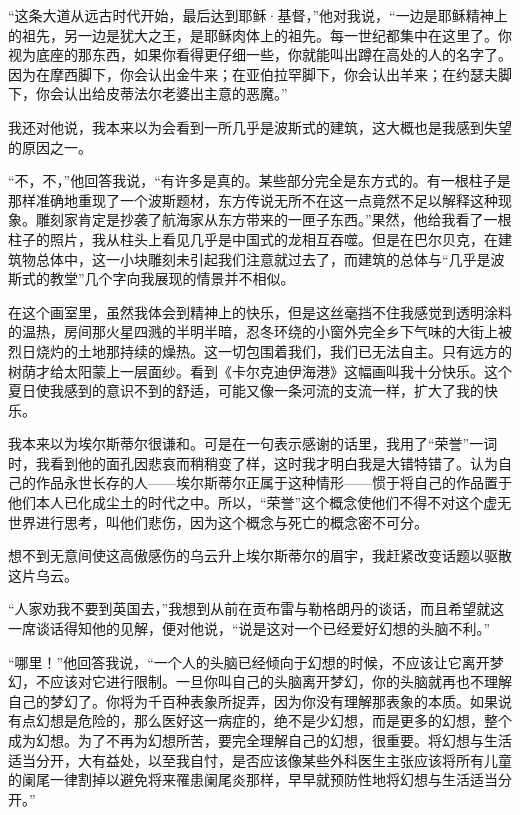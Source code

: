 \par “这条大道从远古时代开始，最后达到耶稣·基督，”他对我说，“一边是耶稣精神上的祖先，另一边是犹大之王，是耶稣肉体上的祖先。每一世纪都集中在这里了。你视为底座的那东西，如果你看得更仔细一些，你就能叫出蹲在高处的人的名字了。因为在摩西脚下，你会认出金牛来；在亚伯拉罕脚下，你会认出羊来；在约瑟夫脚下，你会认出给皮蒂法尔老婆出主意的恶魔。”
\par 我还对他说，我本来以为会看到一所几乎是波斯式的建筑，这大概也是我感到失望的原因之一。
\par “不，不，”他回答我说，“有许多是真的。某些部分完全是东方式的。有一根柱子是那样准确地重现了一个波斯题材，东方传说无所不在这一点竟然不足以解释这种现象。雕刻家肯定是抄袭了航海家从东方带来的一匣子东西。”果然，他给我看了一根柱子的照片，我从柱头上看见几乎是中国式的龙相互吞噬。但是在巴尔贝克，在建筑物总体中，这一小块雕刻未引起我们注意就过去了，而建筑的总体与“几乎是波斯式的教堂”几个字向我展现的情景并不相似。
\par 在这个画室里，虽然我体会到精神上的快乐，但是这丝毫挡不住我感觉到透明涂料的温热，房间那火星四溅的半明半暗，忍冬环绕的小窗外完全乡下气味的大街上被烈日烧灼的土地那持续的燥热。这一切包围着我们，我们已无法自主。只有远方的树荫才给太阳蒙上一层面纱。看到《卡尔克迪伊海港》这幅画叫我十分快乐。这个夏日使我感到的意识不到的舒适，可能又像一条河流的支流一样，扩大了我的快乐。
\par 我本来以为埃尔斯蒂尔很谦和。可是在一句表示感谢的话里，我用了“荣誉”一词时，我看到他的面孔因悲哀而稍稍变了样，这时我才明白我是大错特错了。认为自己的作品永世长存的人——埃尔斯蒂尔正属于这种情形——惯于将自己的作品置于他们本人已化成尘土的时代之中。所以，“荣誉”这个概念使他们不得不对这个虚无世界进行思考，叫他们悲伤，因为这个概念与死亡的概念密不可分。
\par 想不到无意间使这高傲感伤的乌云升上埃尔斯蒂尔的眉宇，我赶紧改变话题以驱散这片乌云。
\par “人家劝我不要到英国去，”我想到从前在贡布雷与勒格朗丹的谈话，而且希望就这一席谈话得知他的见解，便对他说，“说是这对一个已经爱好幻想的头脑不利。”
\par “哪里！”他回答我说，“一个人的头脑已经倾向于幻想的时候，不应该让它离开梦幻，不应该对它进行限制。一旦你叫自己的头脑离开梦幻，你的头脑就再也不理解自己的梦幻了。你将为千百种表象所捉弄，因为你没有理解那表象的本质。如果说有点幻想是危险的，那么医好这一病症的，绝不是少幻想，而是更多的幻想，整个成为幻想。为了不再为幻想所苦，要完全理解自己的幻想，很重要。将幻想与生活适当分开，大有益处，以至我自忖，是否应该像某些外科医生主张应该将所有儿童的阑尾一律割掉以避免将来罹患阑尾炎那样，早早就预防性地将幻想与生活适当分开。”
